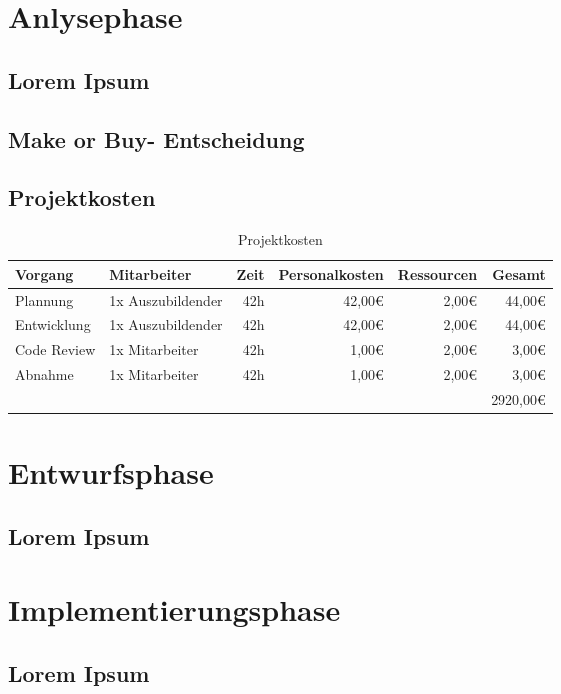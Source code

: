 \documentclass[12pt, a4paper]{article}
\begin{document}
\section{Anlysephase}
    \subsection{Lorem Ipsum}
    \lipsum[1-2]
    \subsection{\glqq{}Make or Buy\grqq{}- Entscheidung}
    \lipsum[1]
    \subsection{Projektkosten}
    \begin{table}[h]
        \centering
        \caption{Projektkosten}
        \begin{tabularx}{\linewidth}{|lXrrrr|}
            \hline
            \textbf{Vorgang} & \textbf{Mitarbeiter} & \textbf{Zeit} & \textbf{Personalkosten} & \textbf{Ressourcen} & \textbf{Gesamt}\\
            \hline
            Plannung & 1x Auszubildender & 42h & 42,00€ & 2,00€ & 44,00€ \\
            Entwicklung & 1x Auszubildender & 42h & 42,00€ & 2,00€ & 44,00€ \\
            Code Review & 1x Mitarbeiter & 42h & 1,00€ & 2,00€ & 3,00€ \\
            Abnahme & 1x Mitarbeiter & 42h & 1,00€ & 2,00€ & 3,00€ \\
            \hline
            & & & & & 2920,00€ \\
            \hline
        \end{tabularx}
    \end{table}

\section{Entwurfsphase}
    \subsection{Lorem Ipsum}
    \lipsum[2-3]

\section{Implementierungsphase}
    \subsection{Lorem Ipsum}
    \lipsum[3-4]
\end{document}
